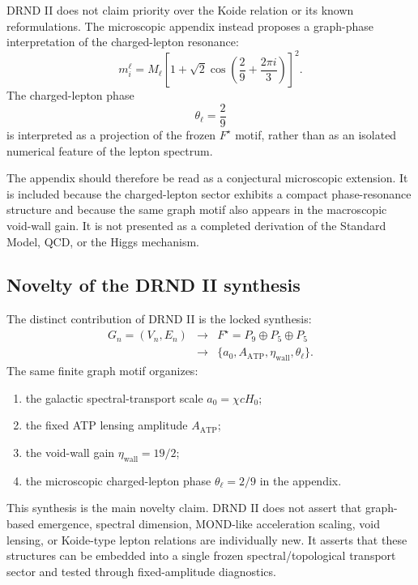 \documentclass[12pt]{iopart}
\begin{document}
DRND II does not claim priority over the Koide relation or its known reformulations. The microscopic appendix instead proposes a graph-phase interpretation of the charged-lepton resonance:
\begin{equation}
m_i^\ell
=
M_\ell
\left[
1+\sqrt{2}\cos\left(
\frac{2}{9}+\frac{2\pi i}{3}
\right)
\right]^2.
\end{equation}
The charged-lepton phase
\begin{equation}
\theta_\ell=\frac{2}{9}
\end{equation}
is interpreted as a projection of the frozen \(F^\star\) motif, rather than as an isolated numerical feature of the lepton spectrum.

The appendix should therefore be read as a conjectural microscopic extension. It is included because the charged-lepton sector exhibits a compact phase-resonance structure and because the same graph motif also appears in the macroscopic void-wall gain. It is not presented as a completed derivation of the Standard Model, QCD, or the Higgs mechanism.

\subsection{Novelty of the DRND II synthesis}

The distinct contribution of DRND II is the locked synthesis:
\begin{eqnarray}
G_n=(V_n,E_n)
&\longrightarrow&
F^\star=P_9\oplus P_5\oplus P_5
\nonumber\\
&\longrightarrow&
\{a_0,A_{\mathrm{ATP}},\eta_{\mathrm{wall}},\theta_\ell\}.
\end{eqnarray}
The same finite graph motif organizes:
\begin{enumerate}
    \item the galactic spectral-transport scale \(a_0=\chi cH_0\);
    \item the fixed ATP lensing amplitude \(A_{\mathrm{ATP}}\);
    \item the void-wall gain \(\eta_{\mathrm{wall}}=19/2\);
    \item the microscopic charged-lepton phase \(\theta_\ell=2/9\) in the appendix.
\end{enumerate}

This synthesis is the main novelty claim. DRND II does not assert that graph-based emergence, spectral dimension, MOND-like acceleration scaling, void lensing, or Koide-type lepton relations are individually new. It asserts that these structures can be embedded into a single frozen spectral/topological transport sector and tested through fixed-amplitude diagnostics.
\end{document}
